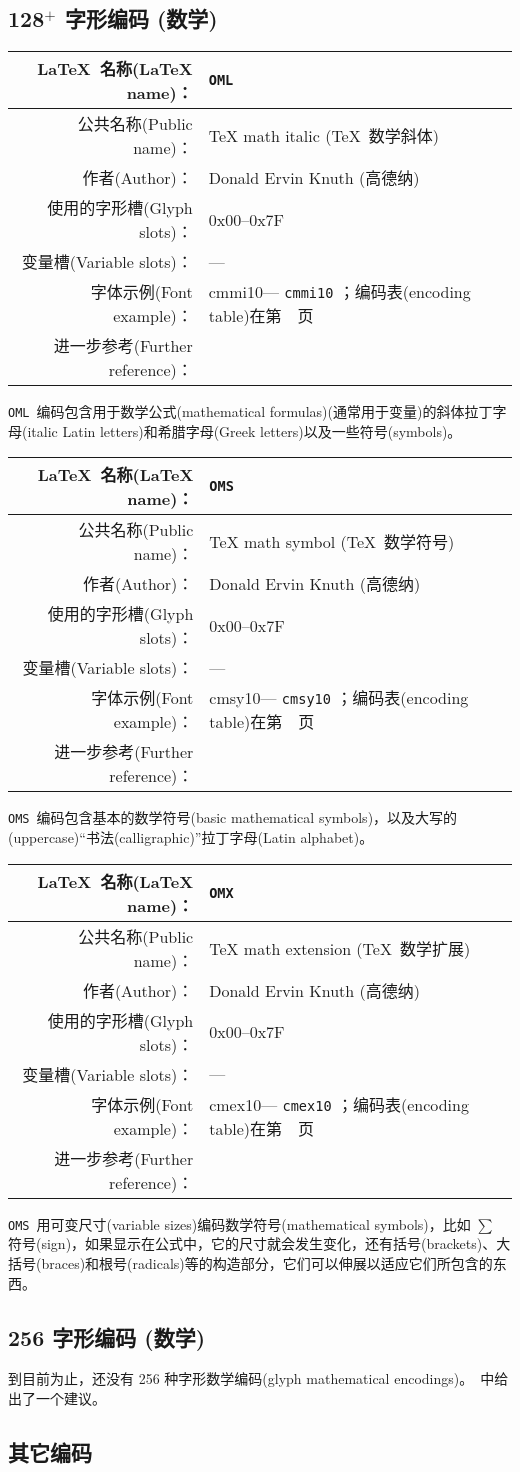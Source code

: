 \documentclass{ltxguide}[1994/11/20]
\makeatletter
\providecommand{\Enc}[1]{\texttt{#1}}
\newenvironment{encodinginfo}[7]%
  {\noindent
   \begin{tabularx}{1.11\textwidth}{|rX|lX|}%
     \hline
     \LaTeX{}\ 名称(\LaTeX{} name)：          & \texttt{#1}\\\hline%
     公共名称(Public name)：          & #2\\\hline%
     作者(Author)：                   & #3\\\hline%
     使用的字形槽(Glyph slots)：& #4\\\hline%
     变量槽(Variable slots)：& #5\\\hline%
     字体示例(Font example)：& \def\@tempa{#6}\ifx\@tempa\@empty---%
                            \else\texttt{#6}\referenceftable{#6}\fi\\\hline%
     进一步参考(Further reference)： & #7\\\hline%
   \end{tabularx}%
   \par\nobreak
   \vspace*{3pt}%
   \quote
  }%
  {\endquote
   \vspace{6pt}}
\def\referenceftable#1{
  \@ifundefined{r@fonttable:#1}%
  \relax
  {；\space 编码表(encoding table)在第~\pageref{fonttable:#1}~页}%
}
\makeatother
\begin{document}
\subsection{128$^+$ 字形编码 (数学)}


\begin{encodinginfo}{OML}
        {\TeX{} math italic (\TeX{}\ 数学斜体)}
        {Donald Ervin Knuth (高德纳)}
        {0x00--0x7F}
        {---}
        {cmmi10}
        {\cite[p.430]{A-W:DKn86}}

  \Enc{OML}\ 编码包含用于数学公式(mathematical formulas)(通常用于变量)的斜体拉丁字母(italic Latin letters)和希腊字母(Greek letters)以及一些符号(symbols)。

\end{encodinginfo}

\begin{encodinginfo}{OMS}
        {\TeX{} math symbol (\TeX{}\ 数学符号)}
        {Donald Ervin Knuth (高德纳)}
        {0x00--0x7F}
        {---}
        {cmsy10}
        {\cite[p.431]{A-W:DKn86}}

  \Enc{OMS}\ 编码包含基本的数学符号(basic mathematical symbols)，以及大写的(uppercase)“书法(calligraphic)”拉丁字母(Latin alphabet)。
\end{encodinginfo}


\begin{encodinginfo}{OMX}
        {\TeX{} math extension (\TeX{}\ 数学扩展)}
        {Donald Ervin Knuth (高德纳)}
        {0x00--0x7F}
        {---}
        {cmex10}
        {\cite[p.432]{A-W:DKn86}}

  \Enc{OMS}\ 用可变尺寸(variable sizes)编码数学符号(mathematical symbols)，比如 $\sum$ 符号(sign)，如果显示在公式中，它的尺寸就会发生变化，还有括号(brackets)、大括号(braces)和根号(radicals)等的构造部分，它们可以伸展以适应它们所包含的东西。

\end{encodinginfo}




\subsection{256 字形编码 (数学)}

到目前为止，还没有 256 种字形数学编码(glyph mathematical encodings)。\cite{ziegler}\ 中给出了一个建议。

\subsection{其它编码}
\end{document}
